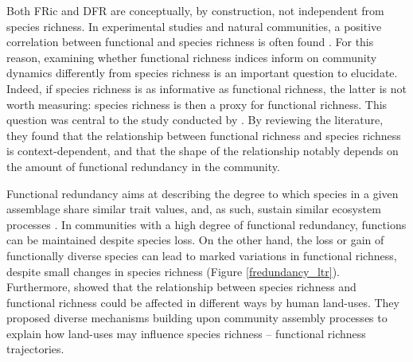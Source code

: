 \vspace{0.5cm}
Both FRic and DFR are conceptually, by construction, not independent from species richness. In experimental studies and natural communities, a positive correlation between functional and species richness is often found \citep{Cadotte2011}. For this reason, examining whether functional richness indices inform on community dynamics differently from species richness is an important question to elucidate. Indeed, if species richness is as informative as functional richness, the latter is not worth measuring: species richness is then a proxy for functional richness. This question was central to the study conducted by \citet{Cadotte2011}. By reviewing the literature, they found that the relationship between functional richness and species richness is context-dependent, and that the shape of the relationship notably depends on the amount of functional redundancy in the community. 

Functional redundancy aims at describing the degree to which species in a given assemblage share similar trait values, and, as such, sustain similar ecosystem processes \citep{Mayfield2010, Rosenfeld2002, Ricotta2016}. In communities with a high degree of functional redundancy, functions can be maintained despite species loss. On the other hand, the loss or gain of functionally diverse species can lead to marked variations in functional richness, despite small changes in species richness (Figure \ref{fredundancy_ltr}). Furthermore, \citet{Mayfield2010} showed that the relationship between species richness and functional richness could be affected in different ways by human land-uses. They proposed diverse mechanisms building upon community assembly processes to explain how land-uses may influence species richness -- functional richness trajectories.  

